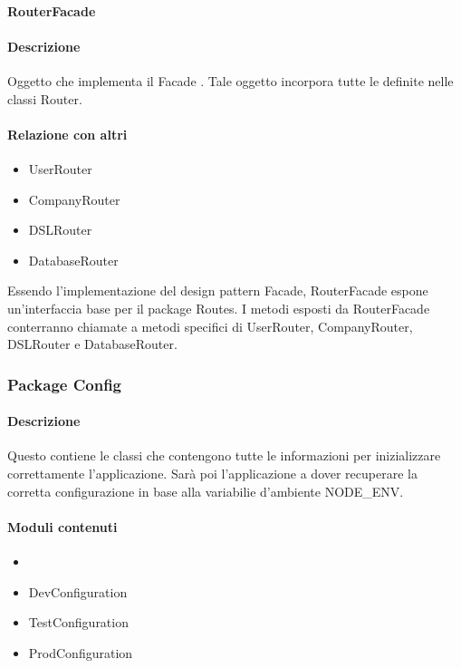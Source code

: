 \paragraph{RouterFacade}
\paragraph*{Descrizione}
Oggetto che implementa il Facade . Tale oggetto incorpora tutte le  definite nelle classi Router.

\paragraph*{Relazione con altri }
\begin{itemize}
\item UserRouter
\item CompanyRouter
\item DSLRouter
\item DatabaseRouter
\end{itemize}
Essendo l'implementazione del design pattern Facade, RouterFacade espone un'interfaccia base per il package Routes. I metodi esposti da RouterFacade conterranno chiamate a metodi specifici di UserRouter, CompanyRouter, DSLRouter e DatabaseRouter.

\subsubsection{Package Config}
\paragraph*{Descrizione}
Questo  contiene le classi  che contengono tutte le informazioni per inizializzare correttamente l'applicazione. 
Sarà poi l'applicazione a dover recuperare la corretta configurazione in base alla variabilie d'ambiente NODE\_ENV.

\paragraph*{Moduli contenuti}
\begin{itemize}
\item {}
\item DevConfiguration
\item TestConfiguration
\item ProdConfiguration
\end{itemize}

